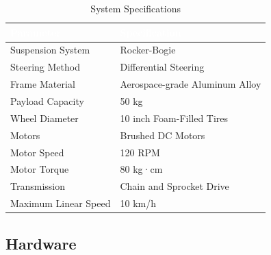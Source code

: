 \documentclass[11pt,a4paper]{article}
\begin{document}
\begin{table}[h]
\centering
\renewcommand{\arraystretch}{1.2}

\begin{tabularx}{\linewidth}{|l|X|}
\hline
\rowcolor{aur_color}
\textcolor{white}{Parameter} & \textcolor{white}{Specification} \\ \hline

Suspension System & Rocker-Bogie \\ \hline
Steering Method & Differential Steering \\ \hline
Frame Material & Aerospace-grade Aluminum Alloy \\ \hline
Payload Capacity & 50 kg \\ \hline
Wheel Diameter & 10 inch Foam-Filled Tires \\ \hline
Motors & Brushed DC Motors \\ \hline
Motor Speed & 120 RPM \\ \hline
Motor Torque & 80 kg·cm \\ \hline
Transmission & Chain and Sprocket Drive \\ \hline
Maximum Linear Speed & 10 km/h \\ \hline

\end{tabularx}

\caption{System Specifications}
\label{tab:specs}

\end{table}


\vspace{-7pt}
\subsection{Hardware}
\end{document}
